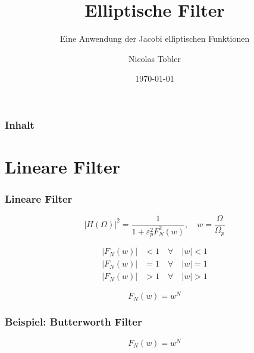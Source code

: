 \documentclass[ngerman, aspectratio=169, xcolor={rgb}]{beamer}
\title{Elliptische Filter}
\subtitle{Eine Anwendung der Jacobi elliptischen Funktionen}
\author{Nicolas Tobler}
\institute{Mathematisches Seminar 2022 | Spezielle Funktionen}
\date{\today}
\begin{document}
	\begin{frame}
		\titlepage
	\end{frame}

	\begin{frame}
		\frametitle{Inhalt}
		\tableofcontents
	\end{frame}

	\section{Lineare Filter}

	\begin{frame}
		\frametitle{Lineare Filter}

		\begin{center}
			\scalebox{0.75}{
				
			}
		\end{center}


		\begin{equation*}
			| H(\Omega)|^2 = \frac{1}{1 + \varepsilon_p^2 F_N^2(w)}, \quad w=\frac{\Omega}{\Omega_p}
		\end{equation*}

		\pause

		\begin{align*}
			|F_N(w)| &< 1 \quad \forall \quad |w| < 1 \\
			|F_N(w)| &= 1 \quad \forall \quad |w| = 1 \\
			|F_N(w)| &> 1 \quad \forall \quad |w| > 1
		\end{align*}


		\begin{equation*}
			F_N(w) = w^N
		\end{equation*}

	\end{frame}

	\begin{frame}
		\frametitle{Beispiel: Butterworth Filter}

		\begin{equation}
			F_N(w) = w^N
		\end{equation}

		\begin{center}
			
		\end{center}

	\end{frame}
\end{document}
